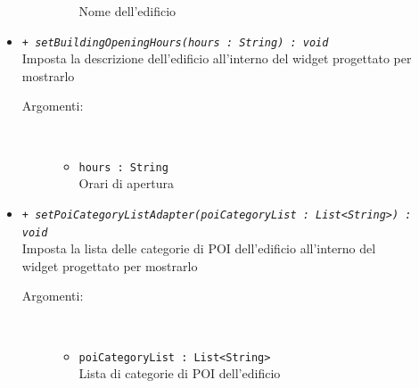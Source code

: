 \documentclass[../DefinizioneDiProdotto.tex]{subfiles}
\begin{document}
\begin{description}
\begin{itemize}
\begin{description}
\begin{itemize}
				Nome dell'edificio\end{itemize}
		\end{description}
		\item \texttt{+ \textit{setBuildingOpeningHours(hours : String) : void}}\\
		Imposta la descrizione dell'edificio all'interno del widget progettato per mostrarlo
		\begin{description}
			\item[Argomenti:] \
			\begin{itemize}
				\item \texttt{hours : String}\\
				Orari di apertura\end{itemize}
		\end{description}
		\item \texttt{+ \textit{setPoiCategoryListAdapter(poiCategoryList : List<String>) : void}}\\
		Imposta la lista delle categorie di POI dell'edificio all'interno del widget progettato per mostrarlo
		\begin{description}
			\item[Argomenti:] \
			\begin{itemize}
				\item \texttt{poiCategoryList : List<String>}\\
				Lista di categorie di POI dell'edificio\end{itemize}
		\end{description}
	\end{itemize}
\end{description}
\end{document}
